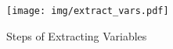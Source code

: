 \begin{figure}[h]
    \centering
    \texttt{[image: img/extract\_vars.pdf]}
    \caption{Steps of Extracting Variables}
    \label{fig:extrac_vars}
\end{figure}